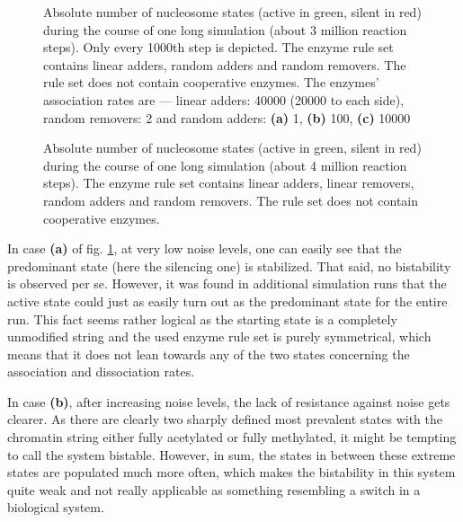 \begin{figure}[htpb!]
\begin{minipage}{\textwidth}
\begin{minipage}{0.85\textwidth}
                    \end{minipage}
                \end{minipage}
                \caption{Absolute number of nucleosome states (active in green, silent in red) during the course of one long simulation (about 3 million reaction steps). Only every 1000th step is depicted. The enzyme rule set contains linear adders, random adders and random removers. The rule set does not contain cooperative enzymes. The enzymes' association rates are — linear adders: 40000 (20000 to each side), random removers: 2 and random adders: \textbf{(a)} 1, \textbf{(b)} 100, \textbf{(c)} 10000}
                \label{img:nonCoopSim}
            \end{figure}

            \begin{figure}[t!]
                \centering
                \caption{Absolute number of nucleosome states (active in green, silent in red) during the course of one long simulation (about 4 million reaction steps). The enzyme rule set contains linear adders, linear removers, random adders and random removers. The rule set does not contain cooperative enzymes.}
                \label{img:nonCoopSim_bonus}
            \end{figure}

            In case \textbf{(a)} of fig. \ref{img:nonCoopSim}, at very low noise levels, one can easily see that the predominant state (here the silencing one) is stabilized. That said, no bistability is observed per se. However, it was found in additional simulation runs that the active state could just as easily turn out as the predominant state for the entire run. This fact seems rather logical as the starting state is a completely unmodified string and the used enzyme rule set is purely symmetrical, which means that it does not lean towards any of the two states concerning the association and dissociation rates.

            In case \textbf{(b)}, after increasing noise levels, the lack of resistance against noise gets clearer. As there are clearly two sharply defined most prevalent states with the chromatin string either fully acetylated or fully methylated, it might be tempting to call the system bistable. However, in sum, the states in between these extreme states are populated much more often, which makes the bistability in this system quite weak and not really applicable as something resembling a switch in a biological system.

